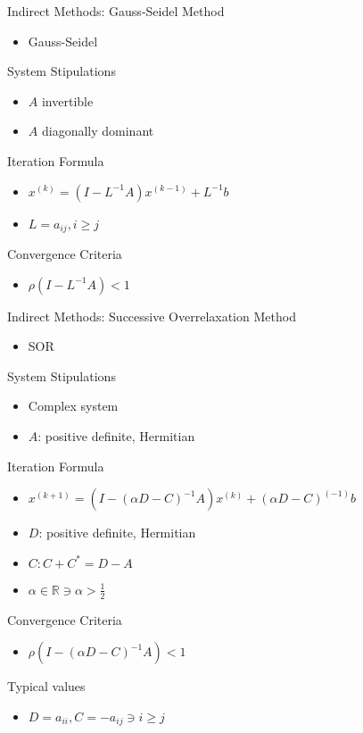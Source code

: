 \documentclass[9pt, serif]{beamer}
\newlength{\wideitemsep}
\let\olditem\item
\renewcommand{\item}{\setlength{\itemsep}{\wideitemsep}\olditem}
\newcommand{\bi}{\begin{itemize}}
\newcommand{\ei}{\end{itemize}}
\begin{document}
\begin{frame}{Indirect Methods: Gauss-Seidel}
    Method
    \bi
        \item Gauss-Seidel
    \ei
    System Stipulations
    \bi
        \item $A$ invertible
        \item $A$ diagonally dominant
    \ei
    Iteration Formula
    \bi
        \item $x^{(k)} = (I-L^{-1}A)x^{(k-1)}+L^{-1}b$
        \item $L = a_{ij}, i \ge j$ 
    \ei
    Convergence Criteria
    \bi
        \item $\rho(I-L^{-1}A)<1$
    \ei
\end{frame}


\begin{frame}{Indirect Methods: Successive Overrelaxation}
    Method
    \bi
        \item SOR
    \ei
    System Stipulations
    \bi
        \item Complex system
        \item $A$: positive definite, Hermitian
    \ei
    Iteration Formula
    \bi
        \item $x^{(k+1)}=(I-(\alpha D-C)^{-1}A)x^{(k)}+(\alpha D-C)^{(-1)}b$
        \item $D$: positive definite, Hermitian
        \item $C: C+C^*=D-A$
        \item $\alpha\in\mathbb{R} \ni \alpha>\frac{1}{2}$
    \ei
    Convergence Criteria
    \bi
        \item $\rho(I-(\alpha D-C)^{-1}A)<1$
    \ei
    Typical values
    \bi
        \item $D = a_{ii}, C = -a_{ij} \ni i \ge j$
    \ei
\end{frame}
\end{document}
